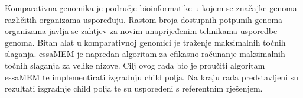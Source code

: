 \documentclass[times, utf8, seminar, numeric]{fer}
\begin{document}



\begin{sazetak}
  Komparativna genomika je područje bioinformatike u kojem se značajke genoma različitih organizama uspoređuju. Rastom broja dostupnih potpunih genoma organizama javlja se zahtjev za novim unaprijeđenim tehnikama usporedbe genoma. Bitan alat u komparativnoj genomici je traženje maksimalnih točnih slaganja. essaMEM je napredan algoritam za efikasno računanje maksimalnih točnih slaganja za velike nizove. Cilj ovog rada bio je proučiti algoritam essaMEM te implementirati izgradnju child polja. Na kraju rada predstavljeni su rezultati izgradnje child polja te su uspoređeni s referentnim rješenjem.

\end{sazetak}
\end{document}
